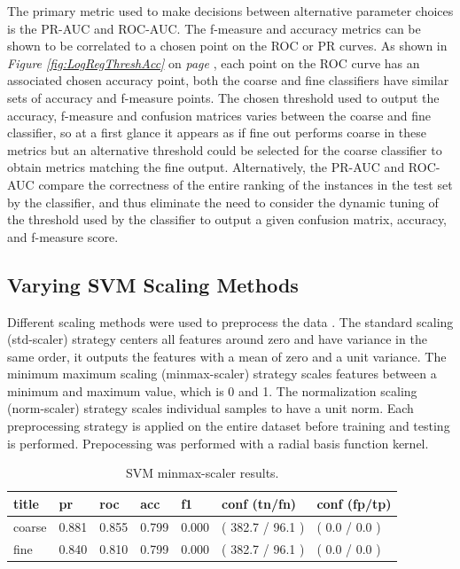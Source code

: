 \documentclass[ms]{nuthesis}
\begin{document}
\par The primary metric used to make decisions between alternative parameter choices is the PR-AUC and
ROC-AUC. The f-measure and accuracy metrics can be shown to be correlated to a chosen point on the ROC or
PR curves. As shown in \textit{Figure \ref{fig:LogRegThreshAcc}} on \textit{page \pageref{fig:LogRegThreshAcc}},
each point on the ROC curve has an associated chosen accuracy point, both the coarse and fine classifiers have similar
sets of accuracy and f-measure points. The chosen threshold used to output the accuracy, f-measure and confusion matrices
varies between the coarse and fine classifier, so at a first glance it appears as if fine out performs coarse in these
metrics but an alternative threshold could be selected for the coarse classifier to obtain metrics matching the fine
output. Alternatively, the PR-AUC and ROC-AUC compare the correctness of the entire ranking of the
instances in the test set by the classifier, and thus eliminate the need to consider the dynamic tuning of the threshold
used by the classifier to output a given confusion matrix, accuracy, and f-measure score.



\subsection{Varying SVM Scaling Methods}
\par Different scaling methods were used to preprocess the data \cite{scikit-learn}. The standard scaling (std-scaler) strategy
centers all features around zero and have variance in the same order, it outputs the features with a mean of zero
and a unit variance. The minimum maximum scaling (minmax-scaler) strategy scales features between a minimum and maximum value,
which is 0 and 1. The normalization scaling (norm-scaler) strategy scales individual samples to have a unit norm. Each
preprocessing strategy is applied on the entire dataset before training and testing is performed. Prepocessing was performed
with a radial basis function kernel.

\FloatBarrier
\begin{table}[H]
\centering
\begin{tabular}{|l||l||l||l||l||l||l|}\toprule
title & pr & roc & acc & f1 & conf (tn/fn) & conf (fp/tp) \\ \midrule
coarse & 0.881 & 0.855 & 0.799 & 0.000 & ( 382.7 / 96.1 ) & ( 0.0 / 0.0 ) \\
fine & 0.840 & 0.810 & 0.799 & 0.000 & ( 382.7 / 96.1 ) & ( 0.0 / 0.0 ) \\ \bottomrule
\end{tabular}
\caption{SVM minmax-scaler results.}
\label{tab:SVMMinMax}
\end{table}
\FloatBarrier
\end{document}
